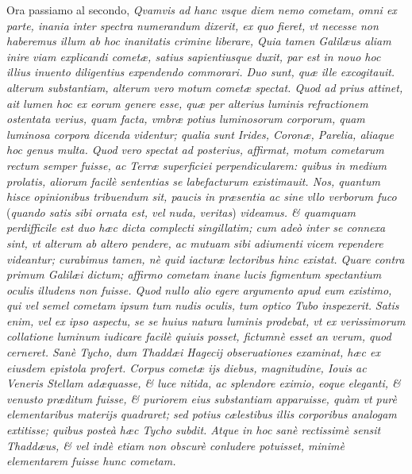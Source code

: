 \documentclass[11pt,twoside,openany]{book}
\begin{document}
\par\bigskip\noindent{}\enspace Ora passiamo al secondo, \textit{Qvamvis ad hanc vsque diem nemo cometam, omni ex parte, inania inter spectra numerandum dixerit, ex quo fieret, vt necesse non haberemus illum ab hoc inanitatis crimine liberare, Quia tamen Galilæus aliam inire viam explicandi cometæ, satius sapientiusque duxit, par est in nouo hoc illius inuento diligentius expendendo commorari. Duo sunt, quæ ille excogitauit. alterum substantiam, alterum vero motum cometæ spectat. Quod ad prius attinet, ait lumen hoc ex eorum genere esse, quæ per alterius luminis refractionem ostentata verius, quam facta, vmbræ potius luminosorum corporum, quam luminosa corpora dicenda videntur; qualia sunt Irides, Coronæ, Parelia, aliaque hoc genus multa. Quod vero spectat ad posterius, affirmat, motum cometarum rectum semper fuisse, ac Terræ superficiei perpendicularem: quibus in medium prolatis, aliorum facilè sententias se labefacturum existimauit. Nos, quantum hisce opinionibus tribuendum sit, paucis in præsentia ac sine vllo verborum fuco }(\textit{quando satis sibi ornata est, vel nuda, veritas})\textit{ videamus. \& quamquam perdifficile est duo hæc dicta complecti singillatim; cum adeò inter se connexa sint, vt alterum ab altero pendere, ac mutuam sibi adiumenti vicem rependere videantur; curabimus tamen, nè quid iacturæ lectoribus hinc existat. Quare contra primum Galilæi dictum; affirmo cometam inane lucis figmentum spectantium oculis illudens non fuisse. Quod nullo alio egere argumento }\textit{apud eum existimo, qui vel semel cometam ipsum tum nudis oculis, tum optico Tubo inspexerit. }\textit{Satis enim, vel ex ipso aspectu, se se huius natura luminis prodebat, vt ex verissimorum collatione luminum iudicare facilè quiuis posset, fictumnè esset an verum, quod cerneret. Sanè Tycho, dum Thaddæi Hagecij obseruationes examinat, hæc ex eiusdem epistola profert. Corpus cometæ ijs diebus, magnitudine, Iouis ac Veneris Stellam adæquasse, \& luce nitida, ac splendore eximio, eoque eleganti, \& venusto præditum fuisse, \& puriorem eius substantiam apparuisse, quàm vt purè elementaribus materijs quadraret; sed potius cælestibus illis corporibus analogam extitisse; quibus posteà hæc Tycho subdit. Atque in hoc sanè rectissimè sensit Thaddæus, \& vel indè etiam non obscurè conludere potuisset, minimè elementarem fuisse hunc cometam.}
\end{document}
